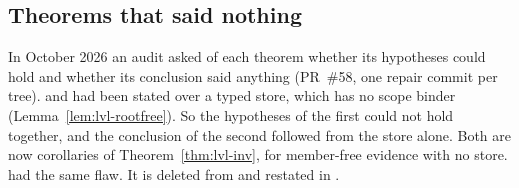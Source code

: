 \subsection{Theorems that said nothing}

In October 2026 an audit asked of each theorem whether its hypotheses could hold and whether its conclusion said anything (PR~\#58, one repair commit per tree).  and  had been stated over a typed store, which has no scope binder (Lemma~\ref{lem:lvl-rootfree}). So the hypotheses of the first could not hold together, and the conclusion of the second followed from the store alone. Both are now corollaries of Theorem~\ref{thm:lvl-inv}, for member-free evidence with no store.  had the same flaw. It is deleted from \treeCC and restated in \treeCL.
